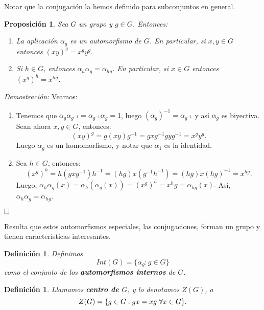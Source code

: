 \documentclass[12pt]{article}
\newtheorem{proposition}[theorem]{Proposición}
\newtheorem{definition}[theorem]{Definición}
\begin{document}
Notar que la conjugación la hemos definido para subconjuntos en general.

\begin{proposition}Sea $G$ un grupo y $g \in G$. Entonces:
\begin{enumerate}
\item La aplicación $\alpha_g$ es un automorfismo de $G$. En particular, si $x,y \in G$ entonces $(xy)^g = x^gy^g.$
\item Si $h \in G$, entonces $\alpha_h \alpha_g = \alpha_{hg}$. En particular, si $x \in G$ entonces $(x^g)^h = x^{hg}$.
\end{enumerate}
\end{proposition}
\emph{Demostración: }Veamos:
\begin{enumerate}
\item Tenemos que $\alpha_g \alpha_{g^{-1}} = \alpha_{g^{-1}} \alpha_g = 1$, luego $(\alpha_g)^{-1}=\alpha_{g^{-1}}$ y así $\alpha_g$ es biyectiva. Sean ahora $x,y \in G$, entonces: $$(xy)^g = g(xy)g^{-1} = gxg^{-1}gyg^{-1} = x^gy^g.$$ Luego $\alpha_g$ es un homomorfismo, y notar que $\alpha_1$ es la identidad.
\item Sea $h \in G$, entonces: $$(x^g)^h=h(gxg^{-1})h^{-1} = (hg)x(g^{-1}h^{-1}) = (hg)x(hg)^{-1} = x^{hg}.$$ Luego, $\alpha_h\alpha_g(x) =\alpha_h(\alpha_g(x)) = (x^g)^h = x^hg = \alpha_{hg}(x).$ Así, $\alpha_h\alpha_g = \alpha_{hg}$. 
\end{enumerate}

$\hfill \square$

Resulta que estos automorfismos especiales, las conjugaciones, forman un grupo y tienen características interesantes.

\begin{definition}Definimos $$Int (G) = \lbrace \alpha_g :g \in G \rbrace$$ como el conjunto de los \textbf{automorfismos internos} de $G$.
\end{definition}

\begin{definition}Llamamos \textbf{centro de $G$}, y lo denotamos $Z(G)$, a $$Z(G) = \lbrace g \in G: gx = xg \hspace{0.1cm} \forall x \in G \rbrace.$$
\end{definition}
\end{document}
